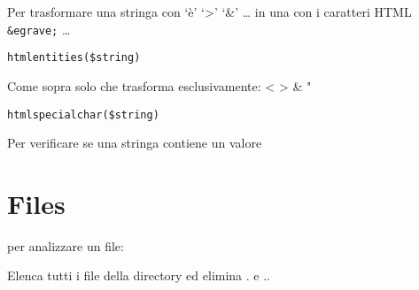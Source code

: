 \documentclass[]{article}
\newenvironment{Shaded}{}{}
\newcommand{\KeywordTok}[1]{\textcolor[rgb]{0.00,0.44,0.13}{\textbf{{#1}}}}
\newcommand{\StringTok}[1]{\textcolor[rgb]{0.25,0.44,0.63}{{#1}}}
\newcommand{\OtherTok}[1]{\textcolor[rgb]{0.00,0.44,0.13}{{#1}}}
\newcommand{\FunctionTok}[1]{\textcolor[rgb]{0.02,0.16,0.49}{{#1}}}
\newcommand{\ErrorTok}[1]{\textcolor[rgb]{1.00,0.00,0.00}{\textbf{{#1}}}}
\newcommand{\NormalTok}[1]{{#1}}
\begin{document}
Per trasformare una stringa con `è' `\textgreater{}' `\&' \ldots{} in
una con i caratteri HTML \texttt{\&egrave;} \ldots{}

\begin{verbatim}
htmlentities($string)
\end{verbatim}

Come sopra solo che trasforma esclusivamente: \textless{} \textgreater{}
\& "

\begin{verbatim}
htmlspecialchar($string)
\end{verbatim}

Per verificare se una stringa contiene un valore

\begin{Shaded}
\end{Shaded}

\section{Files}\label{files}

per analizzare un file:

\begin{Shaded}
\end{Shaded}

Elenca tutti i file della directory ed elimina . e ..
\end{document}
